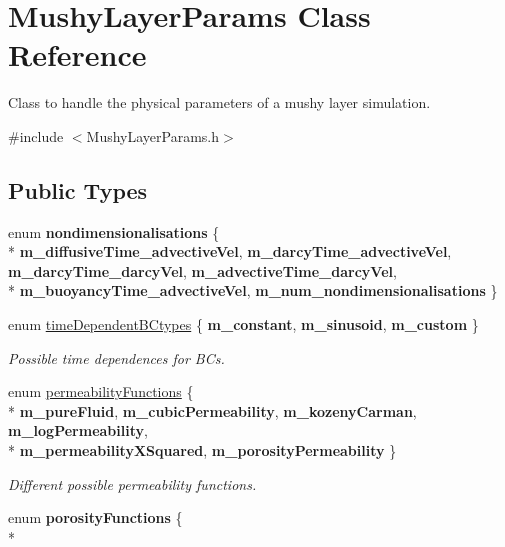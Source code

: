 \hypertarget{class_mushy_layer_params}{\section{Mushy\-Layer\-Params Class Reference}
\label{class_mushy_layer_params}
}


Class to handle the physical parameters of a mushy layer simulation.  




{\ttfamily \#include $<$Mushy\-Layer\-Params.\-h$>$}

\subsection*{Public Types}
\begin{DoxyCompactItemize}
\item 
enum {\bfseries nondimensionalisations} \{ \\*
{\bfseries m\-\_\-diffusive\-Time\-\_\-advective\-Vel}, 
{\bfseries m\-\_\-darcy\-Time\-\_\-advective\-Vel}, 
{\bfseries m\-\_\-darcy\-Time\-\_\-darcy\-Vel}, 
{\bfseries m\-\_\-advective\-Time\-\_\-darcy\-Vel}, 
\\*
{\bfseries m\-\_\-buoyancy\-Time\-\_\-advective\-Vel}, 
{\bfseries m\-\_\-num\-\_\-nondimensionalisations}
 \}
\item 
enum \hyperlink{class_mushy_layer_params_a029cd583b3d31671363f600177a885ac}{time\-Dependent\-B\-Ctypes} \{ {\bfseries m\-\_\-constant}, 
{\bfseries m\-\_\-sinusoid}, 
{\bfseries m\-\_\-custom}
 \}
\begin{DoxyCompactList}\small\item\em Possible time dependences for B\-Cs. \end{DoxyCompactList}\item 
enum \hyperlink{class_mushy_layer_params_aed4f8585e71acda083351ecdc6be5b5c}{permeability\-Functions} \{ \\*
{\bfseries m\-\_\-pure\-Fluid}, 
{\bfseries m\-\_\-cubic\-Permeability}, 
{\bfseries m\-\_\-kozeny\-Carman}, 
{\bfseries m\-\_\-log\-Permeability}, 
\\*
{\bfseries m\-\_\-permeability\-X\-Squared}, 
{\bfseries m\-\_\-porosity\-Permeability}
 \}
\begin{DoxyCompactList}\small\item\em Different possible permeability functions. \end{DoxyCompactList}\item 
enum {\bfseries porosity\-Functions} \{ \\*

\end{DoxyCompactItemize}
